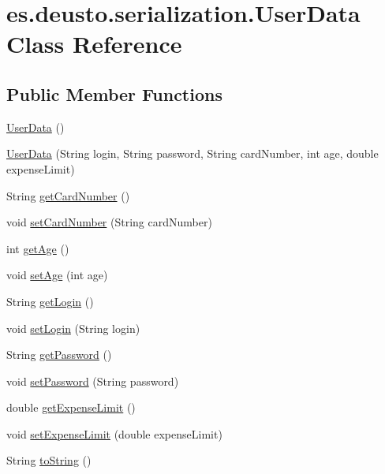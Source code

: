 \hypertarget{classes_1_1deusto_1_1serialization_1_1_user_data}{}\section{es.\+deusto.\+serialization.\+User\+Data Class Reference}
\label{classes_1_1deusto_1_1serialization_1_1_user_data}
\subsection*{Public Member Functions}
\begin{DoxyCompactItemize}
\item 
\hyperlink{classes_1_1deusto_1_1serialization_1_1_user_data_a7bd940bf1869b9c6f8e7161e8ee38121}{User\+Data} ()
\item 
\hyperlink{classes_1_1deusto_1_1serialization_1_1_user_data_a1e5467f049328c59142c240f52dec0ec}{User\+Data} (String login, String password, String card\+Number, int age, double expense\+Limit)
\item 
String \hyperlink{classes_1_1deusto_1_1serialization_1_1_user_data_adc9600b53ed572bf0f5702c04b1f37aa}{get\+Card\+Number} ()
\item 
void \hyperlink{classes_1_1deusto_1_1serialization_1_1_user_data_a20d9f43c3a0007407a02463743c65d87}{set\+Card\+Number} (String card\+Number)
\item 
int \hyperlink{classes_1_1deusto_1_1serialization_1_1_user_data_a281f8b7852a755d0c71a8a56421d84a5}{get\+Age} ()
\item 
void \hyperlink{classes_1_1deusto_1_1serialization_1_1_user_data_a0d79539941068f8b01614c15516e2207}{set\+Age} (int age)
\item 
String \hyperlink{classes_1_1deusto_1_1serialization_1_1_user_data_a6cb9be263b3577d3adbefc8af9d4fae8}{get\+Login} ()
\item 
void \hyperlink{classes_1_1deusto_1_1serialization_1_1_user_data_a4a1de61a3a73d1d217be31c868f5674b}{set\+Login} (String login)
\item 
String \hyperlink{classes_1_1deusto_1_1serialization_1_1_user_data_abfa42147b4a2fe85f8c002a856069576}{get\+Password} ()
\item 
void \hyperlink{classes_1_1deusto_1_1serialization_1_1_user_data_a28efba1d140f0b371bfc777d1c825614}{set\+Password} (String password)
\item 
double \hyperlink{classes_1_1deusto_1_1serialization_1_1_user_data_aea7671316b15d81d7db15c24c373321c}{get\+Expense\+Limit} ()
\item 
void \hyperlink{classes_1_1deusto_1_1serialization_1_1_user_data_a9d799743d50e5f231344a72596b3f5f9}{set\+Expense\+Limit} (double expense\+Limit)
\item 
String \hyperlink{classes_1_1deusto_1_1serialization_1_1_user_data_ac2a905aeaf972596d8fd135d76c763cd}{to\+String} ()
\end{DoxyCompactItemize}


